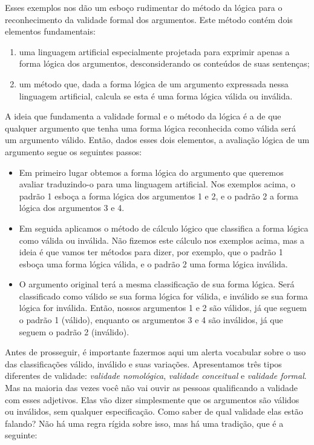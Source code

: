 Esses exemplos nos dão um esboço rudimentar do método da lógica para o reconhecimento da validade formal dos argumentos.
Este método contém dois elementos fundamentais:
\begin{enumerate}
	\item  uma linguagem artificial especialmente projetada para exprimir apenas a forma lógica dos argumentos, desconsiderando os conteúdos de suas sentenças;
	\item um método que, dada a forma lógica de um argumento expressada nessa linguagem artificial, calcula se esta é uma forma lógica válida ou inválida.
\end{enumerate}
A ideia que fundamenta a validade formal e o método da lógica é a de que qualquer argumento que tenha uma forma lógica reconhecida como válida será um argumento válido.
Então, dados esses dois elementos, a avaliação lógica de um argumento segue os seguintes passos:
\begin{itemize}
	\item Em primeiro lugar obtemos a forma lógica do argumento que queremos avaliar traduzindo-o para uma linguagem artificial. Nos exemplos acima, o padrão 1 esboça a forma lógica dos argumentos 1 e 2, e o padrão 2 a forma lógica dos argumentos 3 e 4.
	\item Em seguida aplicamos o método de cálculo lógico que classifica a forma lógica como válida ou inválida. Não fizemos este cálculo nos exemplos acima, mas a ideia é que vamos ter métodos para dizer, por exemplo, que o padrão 1 esboça uma forma lógica válida, e o padrão 2 uma forma lógica inválida.
	\item O argumento original terá a mesma classificação de sua forma lógica. Será classificado como válido se sua forma lógica for válida, e inválido se sua forma lógica for inválida. Então, nossos argumentos 1 e 2 são válidos, já que seguem o padrão 1 (válido), enquanto os argumentos 3 e 4 são inválidos, já que seguem o padrão 2 (inválido).
\end{itemize}
Antes de prosseguir, é importante fazermos aqui um alerta vocabular sobre o uso das classificações válido, inválido e suas variações.
Apresentamos três tipos diferentes de validade: \textit{validade nomológica}, \textit{validade conceitual} e \textit{validade formal}.
Mas na maioria das vezes você não vai ouvir as pessoas qualificando a validade com esses adjetivos.
Elas vão dizer simplesmente que os argumentos são válidos ou inválidos, sem qualquer especificação.
Como saber de qual validade elas estão falando?
Não há uma regra rígida sobre isso, mas há uma tradição, que é a seguinte:
